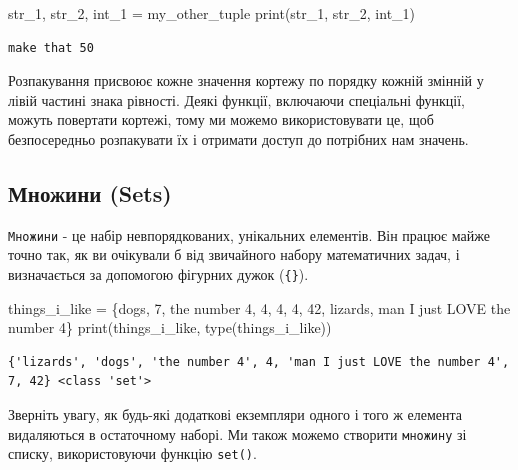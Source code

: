 \documentclass[
  letterpaper,
]{report}
\newenvironment{Shaded}{\begin{snugshade}}{\end{snugshade}}
\newcommand{\BuiltInTok}[1]{\textcolor[rgb]{0.00,0.23,0.31}{#1}}
\newcommand{\DecValTok}[1]{\textcolor[rgb]{0.68,0.00,0.00}{#1}}
\newcommand{\NormalTok}[1]{\textcolor[rgb]{0.00,0.23,0.31}{#1}}
\newcommand{\OperatorTok}[1]{\textcolor[rgb]{0.37,0.37,0.37}{#1}}
\newcommand{\StringTok}[1]{\textcolor[rgb]{0.13,0.47,0.30}{#1}}
\begin{document}
\begin{Shaded}
\begin{Highlighting}[]
\NormalTok{str\_1, str\_2, int\_1 }\OperatorTok{=}\NormalTok{ my\_other\_tuple}
\BuiltInTok{print}\NormalTok{(str\_1, str\_2, int\_1)}
\end{Highlighting}
\end{Shaded}

\begin{verbatim}
make that 50
\end{verbatim}

Розпакування присвоює кожне значення кортежу по порядку кожній змінній у
лівій частині знака рівності. Деякі функції, включаючи спеціальні
функції, можуть повертати кортежі, тому ми можемо використовувати це,
щоб безпосередньо розпакувати їх і отримати доступ до потрібних нам
значень.

\hypertarget{ux43cux43dux43eux436ux438ux43dux438-sets}{%
\subsection{Множини
(Sets)}\label{ux43cux43dux43eux436ux438ux43dux438-sets}}

\texttt{Множини} - це набір невпорядкованих, унікальних елементів. Він
працює майже точно так, як ви очікували б від звичайного набору
математичних задач, і визначається за допомогою фігурних дужок
(\texttt{\{\}}).

\begin{Shaded}
\begin{Highlighting}[]
\NormalTok{things\_i\_like }\OperatorTok{=}\NormalTok{ \{}\StringTok{\textquotesingle{}dogs\textquotesingle{}}\NormalTok{, }\DecValTok{7}\NormalTok{, }\StringTok{\textquotesingle{}the number 4\textquotesingle{}}\NormalTok{, }\DecValTok{4}\NormalTok{, }\DecValTok{4}\NormalTok{, }\DecValTok{4}\NormalTok{, }\DecValTok{42}\NormalTok{, }\StringTok{\textquotesingle{}lizards\textquotesingle{}}\NormalTok{, }\StringTok{\textquotesingle{}man I just LOVE the number 4\textquotesingle{}}\NormalTok{\}}
\BuiltInTok{print}\NormalTok{(things\_i\_like, }\BuiltInTok{type}\NormalTok{(things\_i\_like))}
\end{Highlighting}
\end{Shaded}

\begin{verbatim}
{'lizards', 'dogs', 'the number 4', 4, 'man I just LOVE the number 4', 7, 42} <class 'set'>
\end{verbatim}

Зверніть увагу, як будь-які додаткові екземпляри одного і того ж
елемента видаляються в остаточному наборі. Ми також можемо створити
\texttt{множину} зі списку, використовуючи функцію \texttt{set()}.
\end{document}
